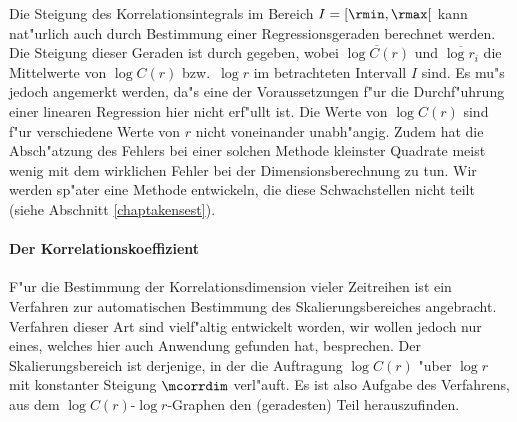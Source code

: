 Die Steigung des Korrelationsintegrals im Bereich $I=[\rmin,\rmax[$ kann nat"urlich auch
durch Bestimmung einer Regressionsgeraden berechnet werden. Die Steigung dieser Geraden
ist durch
gegeben, wobei $\overline{\log C(r)}$ und $\overline{\log r_i}$ die Mittelwerte von $\log C(r)$
bzw.\ $\log r$ im betrachteten Intervall $I$ sind. Es mu"s jedoch angemerkt werden, da"s
eine der Voraussetzungen f"ur die Durchf"uhrung einer linearen Regression hier nicht
erf"ullt ist. Die Werte von $\log C(r)$ sind f"ur verschiedene Werte von $r$ nicht
voneinander unabh"angig. Zudem hat die Absch"atzung des Fehlers bei einer solchen Methode
kleinster Quadrate meist wenig mit dem wirklichen Fehler bei der Dimensionsberechnung zu
tun. Wir werden sp"ater eine Methode entwickeln, die diese Schwachstellen nicht teilt (siehe
Abschnitt \ref{chaptakensest}).

\paragraph{Der Korrelationskoeffizient}
F"ur die Bestimmung der Korrelationsdimension vieler Zeitreihen ist ein Verfahren
zur automatischen Bestimmung des Skalierungsbereiches angebracht. Verfahren dieser Art
sind vielf"altig entwickelt worden, wir wollen jedoch nur eines, welches hier auch
Anwendung gefunden hat, besprechen. Der Skalierungsbereich ist derjenige, in der die
Auftragung $\log C(r)$ "uber $\log r$ mit konstanter Steigung $\mcorrdim$
verl"auft. Es ist also Aufgabe des Verfahrens, aus dem $\log C(r)$-$\log r$-Graphen den
\naja(geradesten) Teil herauszufinden. 

